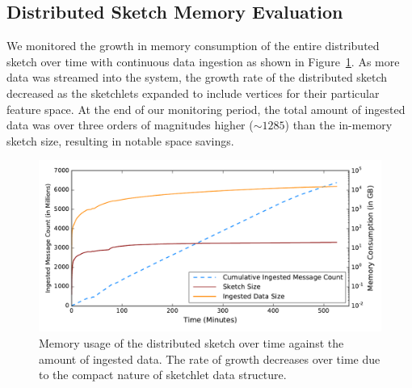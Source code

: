 \subsection{Distributed Sketch Memory Evaluation}
We monitored the growth in memory consumption of the entire distributed sketch over time with continuous data ingestion as shown in Figure~\ref{fig:dist-sketch-mem-usage}. As more data was streamed into the system, the growth rate of the distributed sketch decreased as the sketchlets expanded to include vertices for their particular feature space.  At the end of our monitoring period, the total amount of ingested data was over three orders of magnitudes higher ($\sim 1285$) than the in-memory sketch size, resulting in notable space savings.
%
\begin{figure}[h!]
    \centerline{\includegraphics[width=\linewidth]{figures/ing-and-mem-usage.pdf}}
    \caption{Memory usage of the distributed sketch over time against the amount of ingested data. The rate of growth decreases over time due to the compact nature of sketchlet data structure.}
    \label{fig:dist-sketch-mem-usage}
\end{figure}
%
